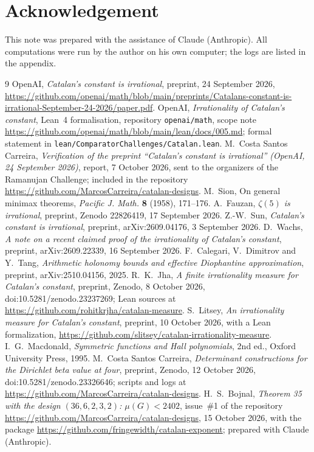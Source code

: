 \documentclass[11pt]{article}
\theoremstyle{definition}
\newcommand{\repo}{\url{https://github.com/MarcosCarreira/catalan-designs}}
\begin{document}
\section*{Acknowledgement}
This note was prepared with the assistance of Claude (Anthropic). All computations were run by the author on his own computer; the logs are listed in the appendix.

\begin{thebibliography}{9}
 OpenAI, \emph{Catalan's constant is irrational}, preprint, 24 September 2026, \url{https://github.com/openai/math/blob/main/preprints/Catalans-constant-is-irrational-September-24-2026/paper.pdf}.
 OpenAI, \emph{Irrationality of Catalan's constant}, Lean~4 formalisation, repository \texttt{openai/math}, scope note \url{https://github.com/openai/math/blob/main/lean/docs/005.md}; formal statement in \texttt{lean/ComparatorChallenges/Catalan.lean}.
 M.~Costa Santos Carreira, \emph{Verification of the preprint ``Catalan's constant is irrational'' (OpenAI, 24 September 2026)}, report, 7 October 2026, sent to the organizers of the Ramanujan Challenge; included in the repository \repo.
 M.~Sion, On general minimax theorems, \emph{Pacific J. Math.} \textbf{8} (1958), 171--176.
 A.~Fauzan, \emph{$\zeta(5)$ is irrational}, preprint, Zenodo 22826419, 17 September 2026.
 Z.-W.~Sun, \emph{Catalan's constant is irrational}, preprint, arXiv:2609.04176, 3 September 2026.
 D.~Wachs, \emph{A note on a recent claimed proof of the irrationality of Catalan's constant}, preprint, arXiv:2609.22339, 16 September 2026.
 F.~Calegari, V.~Dimitrov and Y.~Tang, \emph{Arithmetic holonomy bounds and effective Diophantine approximation}, preprint, arXiv:2510.04156, 2025.
 R.~K.~Jha, \emph{A finite irrationality measure for Catalan's constant}, preprint, Zenodo, 8 October 2026, doi:10.5281/zenodo.23237269; Lean sources at \url{https://github.com/rohitkrjha/catalan-measure}.
 S.~Litsey, \emph{An irrationality measure for Catalan's constant}, preprint, 10 October 2026, with a Lean formalization, \url{https://github.com/slitsey/catalan-irrationality-measure}.
 I.~G.~Macdonald, \emph{Symmetric functions and Hall polynomials}, 2nd ed., Oxford University Press, 1995.
 M.~Costa Santos Carreira, \emph{Determinant constructions for the Dirichlet beta value at four}, preprint, Zenodo, 12 October 2026, doi:10.5281/zenodo.23326646; scripts and logs at \url{https://github.com/MarcosCarreira/catalan-designs}.
 H.~S.~Bojnal, \emph{Theorem 35 with the design $(36,6,2,3,2)$: $\mu(G)<2402$}, issue~\#1 of the repository \url{https://github.com/MarcosCarreira/catalan-designs}, 15 October 2026, with the package \url{https://github.com/fringewidth/catalan-exponent}; prepared with Claude (Anthropic).
\end{thebibliography}
\end{document}
